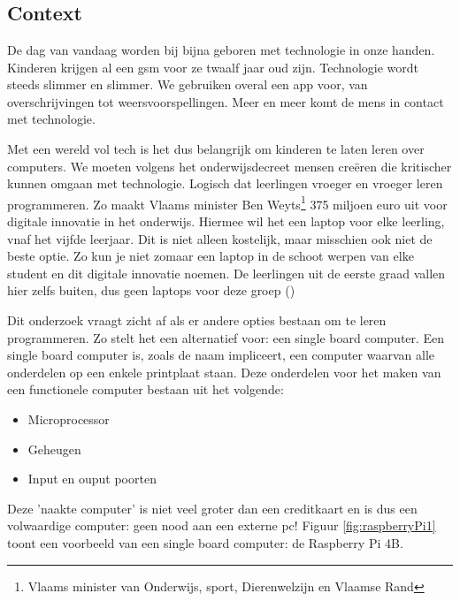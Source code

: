 
\chapter{}
\label{ch:inleiding}


\section{Context}

De dag van vandaag worden bij bijna geboren met technologie in onze handen. Kinderen krijgen al een gsm voor ze twaalf jaar oud zijn. Technologie wordt steeds slimmer en slimmer. We gebruiken overal een app voor, van overschrijvingen tot weersvoorspellingen. Meer en meer komt de mens in contact met technologie. 

Met een wereld vol tech is het dus belangrijk om kinderen te laten leren over computers. We moeten volgens het onderwijsdecreet mensen creëren die kritischer kunnen omgaan met technologie. Logisch dat leerlingen vroeger en vroeger leren programmeren. Zo maakt Vlaams minister Ben Weyts\footnote{Vlaams minister van Onderwijs, sport, Dierenwelzijn en Vlaamse Rand} 375 miljoen euro uit voor digitale innovatie in het onderwijs. Hiermee wil het een laptop voor elke leerling, vnaf het vijfde leerjaar. Dit is niet alleen kostelijk, maar misschien ook niet de beste optie. Zo kun je niet zomaar een laptop in de schoot werpen van elke student en dit digitale innovatie noemen. De leerlingen uit de eerste graad vallen hier zelfs buiten, dus geen laptops voor deze groep (\cite{ArnoutGyssels2020})

Dit onderzoek vraagt zicht af als er andere opties bestaan om te leren programmeren. Zo stelt het een alternatief voor: een single board computer. Een single board computer is, zoals de naam impliceert, een computer waarvan alle onderdelen op een enkele printplaat staan.
Deze onderdelen voor het maken van een functionele computer bestaan uit het volgende:
\begin{itemize}
    \item Microprocessor
    \item Geheugen
    \item Input en ouput poorten
\end{itemize} 
Deze 'naakte computer' is niet veel groter dan een creditkaart en is dus een volwaardige computer: geen nood aan een externe pc! Figuur \ref{fig:raspberryPi1} toont een voorbeeld van een single board computer: de Raspberry Pi 4B. 

